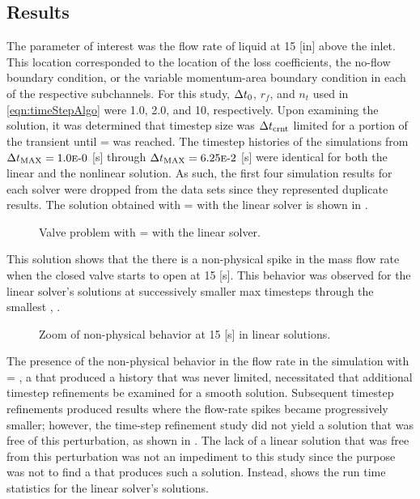 \subsection{Results}
\label{subsect:valveResults}

The parameter of interest was the flow  rate of liquid at 15 [in] above the inlet.
This location corresponded to the location of the loss coefficients, the no-flow boundary condition, or the variable momentum-area boundary condition in each of the respective subchannels.
For this study, $\dt{}_{0}$, $r_{f}$, and $n_{t}$ used in \eqref{eqn:timeStepAlgo} were 1.0, 2.0, and 10, respectively.
Upon examining the solution, it was determined that timestep size was $\dtcrnt{}$ limited for a portion of the transient until \dtmax{} =  was reached.
The timestep histories of the simulations from $\dtmax{} = \expneg{1.0}{0}$ [s] through $\dtmax{} = \expneg{6.25}{2}$ [s] were identical for both the linear and the nonlinear solution.
As such, the first four simulation results for each solver were dropped from the data sets since they represented duplicate results.
The solution obtained with \dtmax{} =  with the linear solver is shown in .

\begin{figure}[h!tb]
\centering

\caption{Valve problem with \dtmax{} =  with the linear solver.}
\label{fig:valveLin6pt25em02}
\end{figure}

This solution shows that the there is a non-physical spike in the mass flow rate when the closed valve starts to open at 15 [s].
This behavior was observed for the linear solver's solutions at successively smaller max timesteps through the smallest \dtmax{}, .

\begin{figure}[h!tb]
\centering

\caption{Zoom of non-physical behavior at 15 [s] in linear solutions.}
\label{fig:valveLinSols}
\end{figure}

The presence of the non-physical behavior in the flow rate in the simulation with \dtmax{} = , a \dtmax{} that produced a \dt{} history that was never \dtcrnt{} limited, necessitated that additional timestep refinements be examined for a smooth solution.
Subsequent timestep refinements produced results where the flow-rate spikes became progressively smaller; however, the time-step refinement study did not yield a solution that was free of this perturbation, as shown in .
The lack of a linear solution that was free from this perturbation was not an impediment to this study since the purpose was not to find a \dtmax{} that produces such a solution.
Instead,  shows the run time statistics for the linear solver's solutions.

